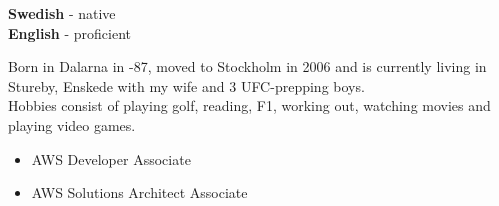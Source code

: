 \documentclass[9pt]{template} %
\begin{document}
\begin{minipage}[t]{0.20\textwidth}
  \vspace{-\baselineskip} %


  \textbf{Swedish} - native\\
  \textbf{English} - proficient
\end{minipage}
\hfill
\begin{minipage}[t]{0.46\textwidth}
  \vspace{-\baselineskip} %


  Born in Dalarna in -87, moved to Stockholm in 2006 and is currently living in Stureby, Enskede with my wife and 3 UFC-prepping boys.\\

  Hobbies consist of playing golf, reading, F1, working out, watching movies and playing video games.
\end{minipage}
\hfill
\begin{minipage}[t]{0.30\textwidth}
  \vspace{-\baselineskip} %


  \vspace{-3mm}
  \begin{itemize}[leftmargin=12pt]
    \setlength{\parskip}{0pt}
    \setlength{\itemsep}{0pt plus 1pt}
    \item AWS Developer {\footnotesize{Associate}}
    \item AWS Solutions Architect {\footnotesize{Associate}}
  \end{itemize}
\end{minipage}


\end{document}

